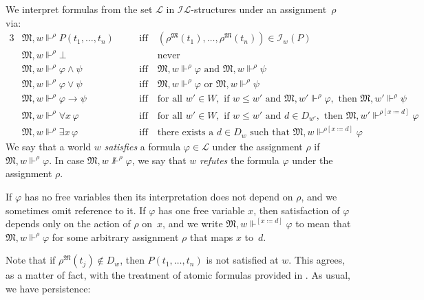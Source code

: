 \documentclass[submission,copyright,creativecommons]{eptcs}
\newcommand{\mo}{\mathfrak}
\renewcommand{\phi}{\varphi}
\renewcommand{\iff}{\quad\text{iff}\quad}
\newcommand{\II}{\mathscr{I}}
\newcommand{\IL}{\mathscr{I\!\!L}}   %
\newcommand{\LL}{\mathcal{L}}        %
\newcommand{\satisfySym}{\Vdash}
\newcommand{\satisfy}[4]{#1, #2 \satisfySym^{#4} #3}
\newcommand{\notsatisfy}[4]{#1, #2 \not\Vdash^{#4} #3}
\begin{document}
\begin{definition}
 We interpret formulas from the set $\LL$ in $\IL$-structures under an assignment~$\rho$ via:
  \begin{alignat*}{3}
    &\satisfy{\mo{M}}{w}{P(t_1, \ldots, t_n)}{\rho}
      &&\iff (\rho^{\mo{M}}(t_1), \ldots, \rho^{\mo{M}}(t_n)) \in \II_w(P) \\
    &\satisfy{\mo{M}}{w}{\bot}{\rho}
      &&\phantom{\iff}\text{never} \\
    &\satisfy{\mo{M}}{w}{\phi \land \psi}{\rho}
      &&\iff \satisfy{\mo{M}}{w}{\phi}{\rho}
        \text{ and } \satisfy{\mo{M}}{w}{\psi}{\rho} \\
    &\satisfy{\mo{M}}{w}{\phi \vee \psi}{\rho}
      &&\iff \satisfy{\mo{M}}{w}{\phi}{\rho}
        \text{ or } \satisfy{\mo{M}}{w}{\psi}{\rho} \\
    &\satisfy{\mo{M}}{w}{\phi \to \psi}{\rho}
      &&\iff \text{for all } w' \in W,
            \text{ if } w \leq w'
            \text{ and } \satisfy{\mo{M}}{w'}{\phi}{\rho},
            \text{ then } \satisfy{\mo{M}}{w'}{\psi}{\rho} \\
    &\satisfy{\mo{M}}{w}{\forall x\, \phi}{\rho}
      &&\iff \text{for all } w' \in W,
            \text{ if } w \leq w'
            \text{ and } d \in D_{w'},
            \text{ then } \satisfy{\mo{M}}{w'}{\phi}{\rho[x \coloneq d]} \\
    &\satisfy{\mo{M}}{w}{\exists x\, \phi}{\rho}
      &&\iff \text{there exists a } d \in D_w
            \text{ such that } \satisfy{\mo{M}}{w}{\phi}{\rho[x \coloneq d]}
  \end{alignat*}
    We say that a world $w$ \emph{satisfies} a formula $\varphi \in \LL$ under the assignment $\rho$ if $\satisfy{\mo{M}}{w}{\varphi}{\rho}$. In case $\notsatisfy{\mo{M}}{w}{\varphi}{\rho}$, we say that $w$ \emph{refutes} the formula $\varphi$ under the assignment $\rho$.

  If $\phi$ has no free variables then its interpretation does not depend on
  $\rho$, and we sometimes omit reference to it.
  If $\phi$ has one free variable $x$, then satisfaction of $\phi$ depends only
  on the action of $\rho$ on~$x$, and we write $\satisfy{\mo{M}}{w}{\phi}{[x \coloneq d]}$
  to mean that $\satisfy{\mo{M}}{w}{\phi}{\rho}$ for some arbitrary assignment $\rho$ that maps $x$ to~$d$.
\end{definition}

  Note that if $\rho^{\mo{M}}(t_j) \notin D_w$, then $P(t_1, \ldots, t_n)$ is not satisfied at $w$.
  This agrees, as a matter of fact, with the treatment of atomic formulas provided in \cite[Chapter 8]{FitMend:2:2023}.
%
  As usual, we have persistence:
\end{document}
